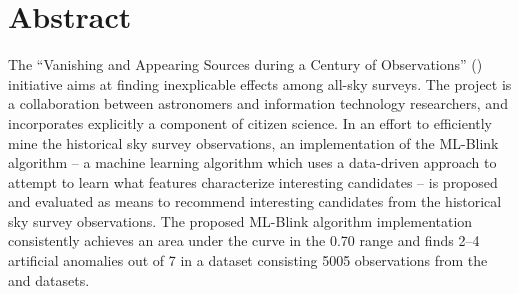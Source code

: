 \section*{Abstract} \label{sect:abstract}

The ``Vanishing and Appearing Sources during a Century of Observations'' (\vasco) initiative aims at finding inexplicable effects among all-sky surveys. The \vasco project is a collaboration between astronomers and information technology researchers, and incorporates explicitly a component of citizen science. In an effort to efficiently mine the historical sky survey observations, an implementation of the ML-Blink algorithm -- a machine learning algorithm which uses a data-driven approach to attempt to learn what features characterize interesting candidates -- is proposed and evaluated as means to recommend interesting candidates from the historical sky survey observations. The proposed ML-Blink algorithm implementation consistently achieves an area under the curve in the 0.70 range and finds 2--4 artificial anomalies out of 7 in a dataset consisting 5005 observations from the \usno and \panstarrs datasets. \newline
